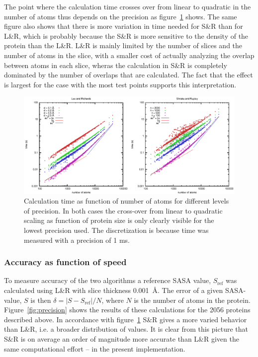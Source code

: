 \documentclass[a4paper,11pt]{article}
\begin{document}
The point where the calculation time crosses over from linear to
quadratic in the number of atoms thus depends on the precision as
figure~\ref{fig:time} shows. The same figure also shows that there is
more variation in time needed for S\&R than for L\&R, which is
probably because the S\&R is more sensitive to the density of the
protein than the L\&R. L\&R is mainly limited by the number of slices
and the number of atoms in the slice, with a smaller cost of actually
analyzing the overlap between atoms in each slice, wheras the
calculation in S\&R is completely dominated by the number of overlaps
that are calculated. The fact that the effect is largest for the case
with the most test points supports this interpretation.

\begin{figure}
  \includegraphics{../analysis/plots/time}
  \caption{Calculation time as function of number of atoms for
    different levels of precision. In both cases the cross-over from
    linear to quadratic scaling as function of protein size is only
    clearly visible for the lowest precision used. The discretization
    is because time was measured with a precision of 1
    ms.\label{fig:time}}
\end{figure}

\subsubsection{Accuracy as function of speed}\label{sec:accuracy}

To measure accuracy of the two algorithms a reference SASA value,
$S_\text{ref}$ was calculated using L\&R with slice thickness
0.001~Å. The error of a given SASA-value, $S$ is then $\delta = \lvert
S - S_\text{ref} \rvert / N$, where $N$ is the number of atoms in the
protein. Figure~\ref{fig:precision} shows the results of these
calculations for the 2056 proteins described above. In accordance with
figure~\ref{fig:time} S\&R gives a more varied behavior than L\&R,
i.e. a broader distribution of values. It is clear from this picture
that S\&R is on average an order of magnitude more accurate than L\&R
given the same computational effort -- in the present implementation.
\end{document}
